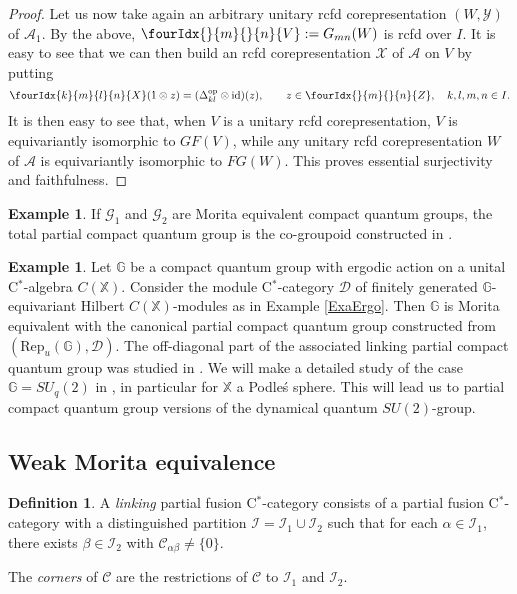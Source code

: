 \documentclass[11pt]{article}
\DeclareMathOperator{\id}{id}
\DeclareMathOperator{\op}{\mathrm{op}}
\newcommand{\G}{\mathbb{G}}
\newcommand{\X}{\mathbb{X}}
\newcommand{\CatC}{\mathcal{C}}
\newcommand{\CatD}{\mathcal{D}}
\newcommand{\CatCC}{\mathscr{C}}
\newcommand{\Rep}{\mathrm{Rep}}
\newcommand{\Gr}[5]{\fourIdx{#2}{#4}{#3}{#5}{#1}}%
\newcommand{\Gru}[3]{\Gr{#1}{}{}{#2}{#3}}
\theoremstyle{definition}
\newtheorem{Def}[Theorem]{Definition}
\newtheorem{Exa}[Theorem]{Example}
\numberwithin{equation}{section}
\begin{document}
\begin{proof}
Let us now take again an arbitrary unitary rcfd corepresentation $(W,\mathscr{Y})$ of $\mathscr{A}_1$. By the above, $\Gru{V}{m}{n} := G_{mn}(W)$ is rcfd over $I$. It is easy to see that we can then build an rcfd corepresentation $\mathscr{X}$ of $\mathscr{A}$ on $V$ by putting \[\Gr{X}{k}{l}{m}{n}(1\otimes z) = (\Delta_{kl}^{\op}\otimes \id)(z),\qquad z\in \Gru{Z}{m}{n}, \quad k,l,m,n\in I.\] It is then easy to see that, when $V$ is a unitary rcfd corepresentation, $V$ is equivariantly isomorphic to $GF(V)$, while any unitary rcfd corepresentation $W$ of $\mathscr{A}$ is equivariantly isomorphic to $FG(W)$. This proves essential surjectivity and faithfulness.
\end{proof}

\begin{Exa} If $\mathscr{G}_1$ and $\mathscr{G}_2$ are Morita equivalent compact quantum groups, the total partial compact quantum group is the co-groupoid constructed in \cite{Bic1}. 
\end{Exa}

\begin{Exa}  Let $\G$ be a compact quantum group with ergodic action on a unital C$^*$-algebra $C(\mathbb{X})$. Consider the module C$^*$-category $\CatD$ of finitely generated $\G$-equivariant Hilbert $C(\mathbb{X})$-modules as in Example \ref{ExaErgo}. Then $\G$ is Morita equivalent with the canonical partial compact quantum group constructed from $(\Rep_u(\G),\CatD)$. The off-diagonal part of the associated linking partial compact quantum group was studied in \cite{DCY1}. We will make a detailed study of the case $\G = SU_q(2)$ in \cite{DCT2}, in particular for $\X$ a Podle\'{s} sphere. This will lead us to partial compact quantum group versions of the dynamical quantum $SU(2)$-group.
\end{Exa}


\subsection{Weak Morita equivalence}

\begin{Def} A \emph{linking} partial fusion C$^*$-category consists of a partial fusion C$^*$-category with a distinguished partition $\mathscr{I} =\mathscr{I}_1 \cup \mathscr{I}_2$ such that for each $\alpha\in \mathscr{I}_1$, there exists $\beta \in \mathscr{I}_{2}$ with $\CatC_{\alpha\beta}\neq \{0\}$.

The \emph{corners} of $\CatCC$ are the restrictions of $\CatCC$ to $\mathscr{I}_1$ and $\mathscr{I}_2$.
\end{Def}
\end{document}
